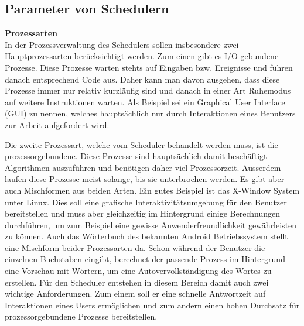 \subsection{Parameter von Schedulern}
\textbf{Prozessarten}\\
In der Prozessverwaltung des Schedulers sollen insbesondere zwei Hauptprozessarten berücksichtigt werden. Zum einen gibt es I/O gebundene Prozesse. Diese Prozesse warten stehts auf Eingaben bzw. Ereignisse und führen danach entsprechend Code aus. Daher kann man davon ausgehen, dass diese Prozesse immer nur relativ kurzläufig sind und danach in einer Art Ruhemodus auf weitere Instruktionen warten. Als Beispiel sei ein Graphical User Interface (GUI) zu nennen, welches hauptsächlich nur durch Interaktionen eines Benutzers zur Arbeit aufgefordert wird.

Die zweite Prozessart, welche vom Scheduler behandelt werden muss, ist die prozessorgebundene. Diese Prozesse sind hauptsächlich damit beschäftigt Algorithmen auszuführen und be\-nötigen daher viel Prozessorzeit. Ausserdem laufen diese Prozesse meist solange, bis sie unterbrochen werden.
Es gibt aber auch Mischformen aus beiden Arten. Ein gutes Beispiel ist das X-Window System unter Linux. Dies soll eine grafische Interaktivitätsumgebung für den Benutzer bereitstellen und muss aber gleichzeitig im Hintergrund einige Berechnungen durchführen, um zum Beispiel eine gewisse Anwenderfreundlichkeit gewähr\-leis\-ten zu können. 
Auch das Wörterbuch des bekannten Android Betriebssystem stellt eine Mischform beider Prozessarten da. Schon während der Benutzer die einzelnen Buchstaben eingibt, berechnet der passende Prozess im Hintergrund eine Vorschau mit Wörtern, um eine Auto\-ver\-voll\-ständigung des Wortes zu erstellen.
Für den Scheduler entstehen in diesem Bereich damit auch zwei wichtige Anforderungen. Zum einem soll er eine schnelle Antwortzeit auf Interaktionen eines Users ermöglichen und zum andern einen hohen Durchsatz für prozessorgebundene Prozesse bereitstellen.

